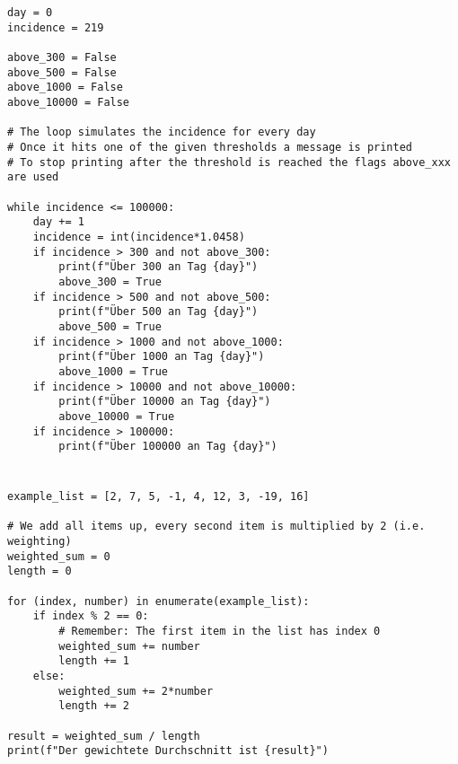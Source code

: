 \documentclass[a4paper]{article}
\begin{document}




\section{}
\begin{verbatim}
day = 0
incidence = 219

above_300 = False
above_500 = False
above_1000 = False
above_10000 = False

# The loop simulates the incidence for every day
# Once it hits one of the given thresholds a message is printed
# To stop printing after the threshold is reached the flags above_xxx are used

while incidence <= 100000:
    day += 1
    incidence = int(incidence*1.0458)
    if incidence > 300 and not above_300:
        print(f"Über 300 an Tag {day}")
        above_300 = True
    if incidence > 500 and not above_500:
        print(f"Über 500 an Tag {day}")
        above_500 = True
    if incidence > 1000 and not above_1000:
        print(f"Über 1000 an Tag {day}")
        above_1000 = True
    if incidence > 10000 and not above_10000:
        print(f"Über 10000 an Tag {day}")
        above_10000 = True
    if incidence > 100000:
        print(f"Über 100000 an Tag {day}")

\end{verbatim}

\section{}
\begin{verbatim}
example_list = [2, 7, 5, -1, 4, 12, 3, -19, 16]

# We add all items up, every second item is multiplied by 2 (i.e. weighting)
weighted_sum = 0
length = 0

for (index, number) in enumerate(example_list):
    if index % 2 == 0:
        # Remember: The first item in the list has index 0
        weighted_sum += number
        length += 1
    else:
        weighted_sum += 2*number
        length += 2

result = weighted_sum / length
print(f"Der gewichtete Durchschnitt ist {result}")
\end{verbatim}

\newpage
\end{document}
